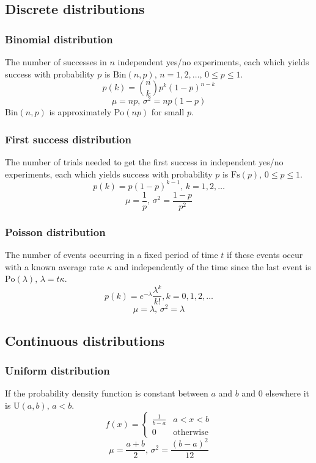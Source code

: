 \subsection{Discrete distributions}

\subsubsection{Binomial distribution}
The number of successes in $n$ independent yes/no experiments, each which yields success with probability $p$ is $\textrm{Bin}(n,p),\,n=1,2,\dots,\, 0\leq p\leq1$.
\[p(k)=\binom{n}{k}p^k(1-p)^{n-k}\]
\[\mu = np,\,\sigma^2=np(1-p)\]
$\textrm{Bin}(n,p)$ is approximately $\textrm{Po}(np)$ for small $p$.

\subsubsection{First success distribution}
The number of trials needed to get the first success in independent yes/no experiments, each which yields success with probability $p$ is $\textrm{Fs}(p),\,0\leq p\leq1$.
\[p(k)=p(1-p)^{k-1},\,k=1,2,\dots\]
\[\mu = \frac1p,\,\sigma^2=\frac{1-p}{p^2}\]

\subsubsection{Poisson distribution}
The number of events occurring in a fixed period of time $t$ if these events occur with a known average rate $\kappa$ and independently of the time since the last event is $\textrm{Po}(\lambda),\,\lambda=t\kappa$.
\[p(k)=e^{-\lambda}\frac{\lambda^k}{k!}, k=0,1,2,\dots\]
\[\mu=\lambda,\,\sigma^2=\lambda\]

\subsection{Continuous distributions}

\subsubsection{Uniform distribution}
If the probability density function is constant between $a$ and $b$ and 0 elsewhere it is $\textrm{U}(a,b),\,a<b$.
\[f(x) = \left\{
\begin{array}{cl}
\frac{1}{b-a} & a<x<b\\
0 & \textrm{otherwise}
\end{array}\right.\]
\[\mu=\frac{a+b}{2},\,\sigma^2=\frac{(b-a)^2}{12}\]

